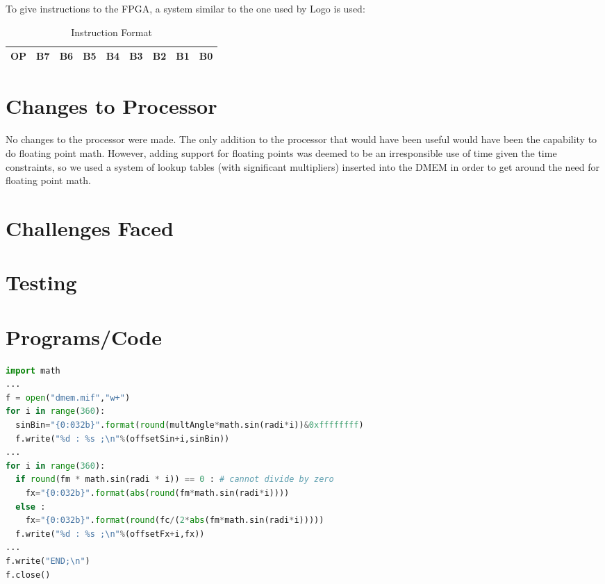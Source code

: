 \documentclass[12pt]{article}
\begin{document}
To give instructions to the FPGA, a system similar to the one used by Logo is used:

\begin{table}[ht!]
\centering
\begin{tabular}{|c|c|c|c|c|c|c|c|c|} \hline
OP & B7 & B6 & B5 & B4 & B3 & B2 & B1 & B0 \\ \hline
\end{tabular}
\caption{Instruction Format}
\end{table}



\section{Changes to Processor}
No changes to the processor were made. The only addition to the processor that would have been useful would have been the capability to do floating point math. However, adding support for floating points was deemed to be an irresponsible use of time given the time constraints, so we used a system of lookup tables (with significant multipliers) inserted into the DMEM in order to get around the need for floating point math.

\section{Challenges Faced}

\section{Testing}

\newpage
\section{Programs/Code}

\begin{lstlisting}[language=python, caption={Python Code for generating Lookup Tables in dmem.mif}, captionpos=b]
import math
... 
f = open("dmem.mif","w+")
for i in range(360):
  sinBin="{0:032b}".format(round(multAngle*math.sin(radi*i))&0xffffffff)
  f.write("%d : %s ;\n"%(offsetSin+i,sinBin))
...
for i in range(360):
  if round(fm * math.sin(radi * i)) == 0 : # cannot divide by zero
    fx="{0:032b}".format(abs(round(fm*math.sin(radi*i))))
  else :
    fx="{0:032b}".format(round(fc/(2*abs(fm*math.sin(radi*i)))))
  f.write("%d : %s ;\n"%(offsetFx+i,fx))
...
f.write("END;\n")
f.close()
\end{lstlisting}
\end{document}
